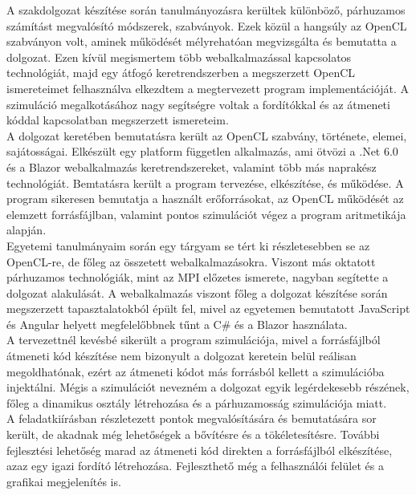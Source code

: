 
A szakdolgozat készítése során tanulmányozásra kerültek különböző, párhuzamos számítást megvalósító módszerek, szabványok. Ezek közül a hangsúly az OpenCL szabványon volt, aminek működését mélyrehatóan megvizsgálta és bemutatta a dolgozat. Ezen kívül megismertem több webalkalmazással kapcsolatos technológiát, majd egy átfogó keretrendszerben a megszerzett OpenCL ismereteimet felhasználva elkezdtem a megtervezett program implementációját. A szimuláció megalkotásához nagy segítségre voltak a fordítókkal és az átmeneti kóddal kapcsolatban megszerzett ismereteim. \\

A dolgozat keretében bemutatásra került az OpenCL szabvány, története, elemei, sajátosságai.
Elkészült egy platform független alkalmazás, ami ötvözi a .Net 6.0 és a Blazor webalkalmazás keretrendszereket, valamint több más naprakész technológiát. Bemtatásra került a program tervezése, elkészítése, és működése. A program sikeresen bemutatja a használt erőforrásokat, az OpenCL működését az elemzett forrásfájlban, valamint pontos szimulációt végez a program aritmetikája alapján.\\

Egyetemi tanulmányaim során egy tárgyam se tért ki részletesebben se az OpenCL-re, de főleg az összetett webalkalmazásokra. Viszont más oktatott párhuzamos technológiák, mint az MPI előzetes ismerete, nagyban segítette a dolgozat alakulását. A webalkalmazás viszont főleg a dolgozat készítése során megszerzett tapasztalatokból épült fel, mivel az egyetemen bemutatott JavaScript és Angular\cite{angular} helyett megfelelőbbnek tűnt a C\# és a Blazor használata. \\

A tervezettnél kevésbé sikerült a program szimulációja, mivel a forrásfájlból átmeneti kód készítése nem bizonyult a dolgozat keretein belül reálisan megoldhatónak, ezért az átmeneti kódot más forrásból kellett a szimulációba injektálni. Mégis a szimulációt nevezném a dolgozat egyik legérdekesebb részének, főleg a dinamikus osztály létrehozása és a párhuzamosság szimulációja miatt.\\

A feladatkiírásban részletezett pontok megvalósítására és bemutatására sor került, de akadnak még lehetőségek a bővítésre és a tökéletesítésre. További fejlesztési lehetőség marad az átmeneti kód direkten a forrásfájlból elkészítése, azaz egy igazi fordító létrehozása. Fejleszthető még a felhasználói felület és a grafikai megjelenítés is.\\


